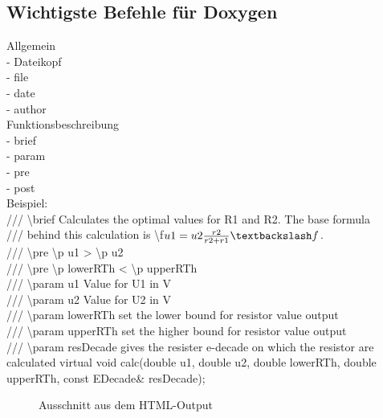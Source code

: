 \subsection{Wichtigste Befehle für Doxygen}
Allgemein \\
- Dateikopf \\
- file \\
- date \\
- author \\

Funktionsbeschreibung \\
- brief \\
- param \\
- pre \\
- post \\

Beispiel: \\
/// \textbackslash brief Calculates the optimal values for R1 and R2. The base formula \\
///        behind this calculation is \textbackslash f$u1=u2 {r2 \over r2+r1}\textbackslash f$. \\
/// \textbackslash pre \textbackslash p u1 > \textbackslash p u2 \\
/// \textbackslash pre \textbackslash p lowerRTh < \textbackslash p upperRTh \\
/// \textbackslash param u1 Value for U1 in V \\
/// \textbackslash param u2 Value for U2 in V \\
/// \textbackslash param lowerRTh set the lower bound for resistor value output \\
/// \textbackslash param upperRTh set the higher bound for resistor value output \\
/// \textbackslash param resDecade gives the resister e-decade on which the resistor are calculated  
virtual void calc(double u1, double u2, double lowerRTh, double upperRTh,
const EDecade\& resDecade); \\

\begin{figure}[ht]
	\centering
	\caption[]{Ausschnitt aus dem HTML-Output}
\end{figure}


